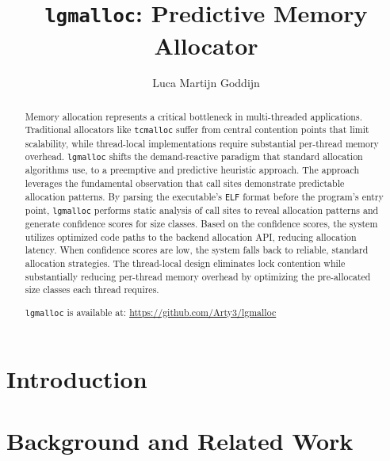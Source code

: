 \documentclass[sigconf,authordraft]{acmart}
\begin{document}

\title{\texttt{lgmalloc}: Predictive Memory Allocator}

\author{Luca Martijn Goddijn}

\begin{abstract}
  Memory allocation represents a critical bottleneck in multi-threaded applications.
  Traditional allocators like \texttt{tcmalloc} suffer from central contention points
  that limit scalability, while thread-local implementations require substantial
  per-thread memory overhead.
  \texttt{lgmalloc} shifts the demand-reactive paradigm that standard allocation
  algorithms use, to a preemptive and predictive heuristic approach.
  The approach leverages the fundamental observation that call sites demonstrate
  predictable allocation patterns.
  By parsing the executable's \texttt{ELF} format before the program's entry point,
  \texttt{lgmalloc} performs static analysis of call sites to reveal allocation
  patterns and generate confidence scores for size classes. Based on the confidence
  scores, the system utilizes optimized code paths to the backend allocation API,
  reducing allocation latency. When confidence scores are low, the system falls back to
  reliable, standard allocation strategies. The thread-local design eliminates lock
  contention while substantially reducing per-thread memory overhead by optimizing
  the pre-allocated size classes each thread requires.

  \texttt{lgmalloc} is available at: \url{https://github.com/Arty3/lgmalloc}
\end{abstract}


\maketitle

\section{Introduction}

\section{Background and Related Work}  
\end{document}
